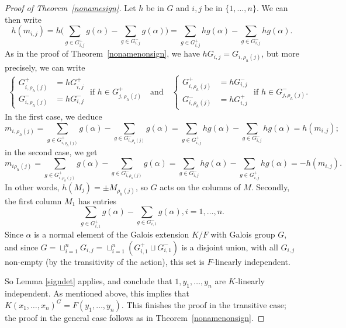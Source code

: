 \documentclass[12pt]{article}
\theoremstyle{plain}
\begin{document}
\begin{proof}[Proof of Theorem~\ref{nonamesign}]
Let $h$ be in $G$
and  $i,j$ be in $\lbrace 1, \ldots, n \rbrace$. We 
can then write
$$h(m_{i,j}) = h\Big( \sum_{g\in G^{+}_{i,j}}g(\alpha) -\sum_{g\in
  G^{-}_{i,j}}g(\alpha)\Big) = \sum_{g\in G^{+}_{i,j}}hg(\alpha)
-\sum_{g\in G^{-}_{i,j}}hg(\alpha).$$ 
As in the proof of Theorem~\ref{nonamenonsign}, we have
$hG_{i,j} = G_{i,\rho_h(j)}$, but more precisely, we can write
\begin{align}
\left \{
\begin{array}{ll}
  G^{+}_{i,\rho_{h}(j)}&= hG^{+}_{i,j}\\
G^{-}_{i,\rho_h(j)}&= hG^{-}_{i,j}
\end{array}\right .
\text{~if~} h \in G^+_{j,\rho_h(j)}
\quad\text{and}\quad
\left \{
\begin{array}{cl}
  G^{+}_{i,\rho_{h}(j)}&= hG^{-}_{i,j}\\
G^{-}_{i,\rho_h(j)}&= hG^{+}_{i,j}
\end{array}\right .
\text{~if~} h \in G^-_{j,\rho_h(j)}.
\end{align}
In the first case, we deduce
$$m_{i,\rho_h(j)} =  \sum_{g\in G^{+}_{i,\rho_h(j)}}g(\alpha) -\sum_{g\in G^{-}_{i,\rho_h(j)}}g(\alpha) 
                  =  \sum_{g\in G^{+}_{i,j}}hg(\alpha) -\sum_{g\in G^{-}_{i,j}}hg(\alpha)
=h(m_{i,j});$$
in the second case, we get
$$m_{i\rho_h(j)} = \sum_{g\in G^{+}_{i,\rho_h(j)}}g(\alpha)
-\sum_{g\in G^{-}_{i,\rho_h(j)}}g(\alpha) = \sum_{g\in
  G^{-}_{i,j}}hg(\alpha) -\sum_{g\in
  G^{+}_{i,j}}hg(\alpha)=-h(m_{i,j}).$$ In other words, $h(M_j) = \pm
M_{\rho_h(j)}$, so $G$ acts on the columns of $M$.
Secondly, the first column $M_1$ has entries 
$$\sum_{g \in G^{+}_{i,1}}g(\alpha)- \sum_{g \in
  G^{-}_{i,1}}g(\alpha), i = 1, \ldots,n.$$ Since $\alpha$ is a normal
element of the Galois extension $K/F$ with Galois group $G$, and since
$G = \sqcup^n_{i =1}G_{i,j}= \sqcup^n_{i =1}(G^{+}_{i,1} \sqcup
G^{-}_{i,1}) $ is a disjoint union, with all $G_{i,j}$ non-empty (by
the transitivity of the action), this set is $F$-linearly independent.

So Lemma \ref{signdet} applies, and conclude that $1, y_1, \ldots,
y_n$ are $K$-linearly independent. As mentioned above, this implies
that $K(x_1,\dots,x_n)^G=F(y_1,\dots,y_n)$.  This finishes the proof
in the transitive case; the proof in the general case follows  as in Theorem~\ref{nonamenonsign}.
\end{proof}
\end{document}
